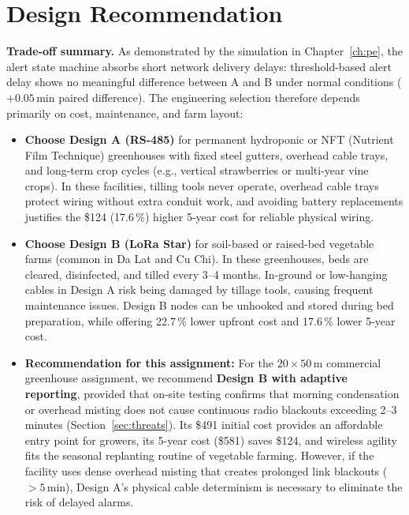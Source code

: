 \documentclass[11pt,a4paper]{report}
\begin{document}
\section{Design Recommendation}\label{sec:rec}
\textbf{Trade-off summary.} As demonstrated by the simulation in Chapter~\ref{ch:pe}, the alert state machine absorbs short network delivery delays: threshold-based alert delay shows no meaningful difference between A and B under normal conditions ($+0.05$\,min paired difference). The engineering selection therefore depends primarily on cost, maintenance, and farm layout:
\begin{itemize}
  \item \textbf{Choose Design A (RS-485)} for permanent hydroponic or NFT (Nutrient Film Technique) greenhouses with fixed steel gutters, overhead cable trays, and long-term crop cycles (e.g., vertical strawberries or multi-year vine crops). In these facilities, tilling tools never operate, overhead cable trays protect wiring without extra conduit work, and avoiding battery replacements justifies the \$124 (17.6\,\%) higher 5-year cost for reliable physical wiring.
  \item \textbf{Choose Design B (LoRa Star)} for soil-based or raised-bed vegetable farms (common in Da Lat and Cu Chi). In these greenhouses, beds are cleared, disinfected, and tilled every 3--4 months. In-ground or low-hanging cables in Design A risk being damaged by tillage tools, causing frequent maintenance issues. Design B nodes can be unhooked and stored during bed preparation, while offering 22.7\,\% lower upfront cost and 17.6\,\% lower 5-year cost.
  \item \textbf{Recommendation for this assignment:} For the $20\times50$\,m commercial greenhouse assignment, we recommend \textbf{Design B with adaptive reporting}, provided that on-site testing confirms that morning condensation or overhead misting does not cause continuous radio blackouts exceeding 2--3 minutes (Section~\ref{sec:threats}). Its \$491 initial cost provides an affordable entry point for growers, its 5-year cost (\$581) saves \$124, and wireless agility fits the seasonal replanting routine of vegetable farming. However, if the facility uses dense overhead misting that creates prolonged link blackouts ($>5$\,min), Design A's physical cable determinism is necessary to eliminate the risk of delayed alarms.
\end{itemize}

\end{document}
